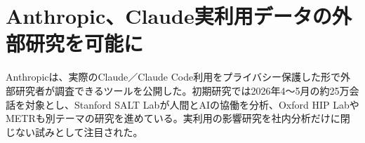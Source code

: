 \section{Anthropic、Claude実利用データの外部研究を可能に}
Anthropicは、実際のClaude／Claude Code利用をプライバシー保護した形で外部研究者が調査できるツールを公開した。初期研究では2026年4〜5月の約25万会話を対象とし、Stanford SALT Labが人間とAIの協働を分析、Oxford HIP LabやMETRも別テーマの研究を進めている。実利用の影響研究を社内分析だけに閉じない試みとして注目された。
